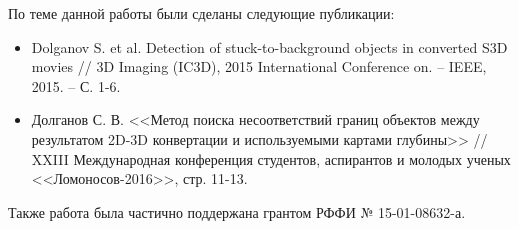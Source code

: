 \documentclass[14pt, a4paper]{extarticle}
\begin{document}
По теме данной работы были сделаны следующие публикации:

\begin{itemize}
	\item Dolganov S. et al. Detection of stuck-to-background objects in converted S3D movies // 3D Imaging (IC3D), 2015 International Conference on. – IEEE, 2015. – С. 1-6.
	\item Долганов С. В. <<Метод поиска несоответствий границ объектов между результатом 2D-3D конвертации и используемыми картами глубины>> // XXIII Международная конференция студентов, аспирантов и молодых ученых <<Ломоносов-2016>>, стр. 11-13.
\end{itemize}

Также работа была частично поддержана грантом РФФИ № 15-01-08632-а.

\newpage


\end{document}
